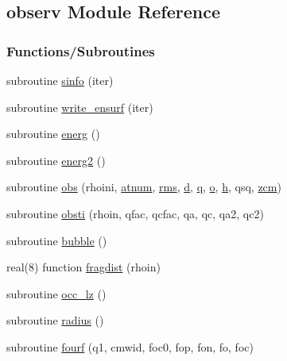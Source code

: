 \hypertarget{namespaceobserv}{}\subsection{observ Module Reference}
\label{namespaceobserv}
\subsubsection*{Functions/\+Subroutines}
\begin{DoxyCompactItemize}
\item 
subroutine \hyperlink{namespaceobserv_a95e1935bb63b583b0ca0575f0f80f1c3}{sinfo} (iter)
\item 
subroutine \hyperlink{namespaceobserv_ae5279f904be9922f8f914643db509aad}{write\+\_\+ensurf} (iter)
\item 
subroutine \hyperlink{namespaceobserv_a3f8b0d008c221139e4f24d70634bfeff}{energ} ()
\item 
subroutine \hyperlink{namespaceobserv_a55eac5863325b72c55b82394b9fbc025}{energ2} ()
\item 
subroutine \hyperlink{namespaceobserv_a5627b5a74b86f1ea84da4e3d8ef274db}{obs} (rhoini, \hyperlink{namespaceobserv_a23f826df2cae1039589aced00fb7939b}{atnum}, \hyperlink{namespaceobserv_a3b3964ead731eed696585a43d22b51f6}{rms}, \hyperlink{namespaceobserv_aac8164517bfe4101667722dfc46f93f6}{d}, \hyperlink{namespaceobserv_af34b6ff143a2dfdf6559141d5d23fbea}{q}, \hyperlink{namespaceobserv_af518f12cf84a544107605bba80b46749}{o}, \hyperlink{namespaceobserv_aee3c6d228879577edf3210d8798f5759}{h}, qsq, \hyperlink{namespaceobserv_a70ecabcf15034808b4bb9500d3826a79}{zcm})
\item 
subroutine \hyperlink{namespaceobserv_a8210a4df1b28eb34510fd9d4bb9851c3}{obsti} (rhoin, qfac, qcfac, qa, qc, qa2, qc2)
\item 
subroutine \hyperlink{namespaceobserv_a5dceadb61af708e4d37dc5f2d5ee3284}{bubble} ()
\item 
real(8) function \hyperlink{namespaceobserv_aad82119702a9563bd04eac2d050e8e47}{fragdist} (rhoin)
\item 
subroutine \hyperlink{namespaceobserv_ac0ebb6d3f156fbd0921aa9d43978dc5d}{occ\+\_\+lz} ()
\item 
subroutine \hyperlink{namespaceobserv_ab795c872e2b2dddd7f5c7a519f49ab92}{radius} ()
\item 
subroutine \hyperlink{namespaceobserv_a6696dab60b04302875af1a9b7ab61fe6}{fourf} (q1, cmwid, foc0, fop, fon, fo, foc)
\item 

\end{DoxyCompactItemize}
